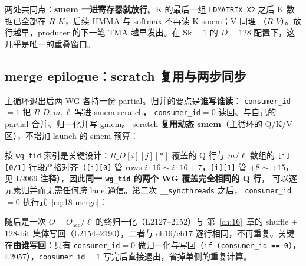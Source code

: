 



两处共同点：\textbf{smem 一进寄存器就放行}。K 的最后一组 \texttt{LDMATRIX\_X2}
之后 K 数据已全部在 $R\_K$，后续 HMMA 与 softmax 不再读 K smem；V 同理
（$R\_V$）。放行越早，producer 的下一笔 TMA 越早发出。在
$\mathrm{Sk}{=}1$ 的 $D{=}128$ 配置下，这几乎是唯一的重叠窗口。

\subsection{merge epilogue：scratch 复用与两步同步}

主循环退出后两 WG 各持一份 partial。归并的要点是\textbf{谁写谁读}：
\texttt{consumer\_id}$=1$ 把 $R\_D, m, \ell$ 写进 smem scratch，
\texttt{consumer\_id}$=0$ 读回、与自己的 partial 合并、归一化并写 gmem。
scratch \textbf{复用动态 smem}（主循环的 Q/K/V 区），不增加 launch 的 smem
预算：





按 \texttt{wg\_tid} 索引是关键设计：$R\_D[i][j][*]$ 覆盖的 Q 行与 $m/\ell$
数组的 \texttt{[i][0/1]} 行段严格对齐（\texttt{[i][0]} 管 rows
$i\cdot16 \sim i\cdot16{+}7$，\texttt{[i][1]} 管 $+8 \sim +15$，见 L2069
注释），因此\textbf{同一 \texttt{wg\_tid} 的两个 WG 覆盖完全相同的 Q 行}，
可以逐元素归并而无需任何跨 lane 通信。第二次 \texttt{\_\allowbreak{}\_\allowbreak{}syncthreads} 之后，
\texttt{consumer\_id}$=0$ 执行式~\ref{eq:18-merge}：



随后是一次 $O = O_{\mathrm{acc}}/\ell$ 的终归一化（L2127--2152）与
第~\ref{ch:16}~章的 shuffle $+$ 128-bit 集体写回（L2154--2190），二者与
ch16/ch17 逐行相同，不再重复。关键在\textbf{由谁写回}：只有
\texttt{consumer\_id}$=0$ 做归一化与写回（\texttt{if \allowbreak{}(consumer\_\allowbreak{}id =\allowbreak{}=\allowbreak{} 0)}，
L2057），\texttt{consumer\_id}$=1$ 写完后直接退出，省掉单侧的重复计算。

